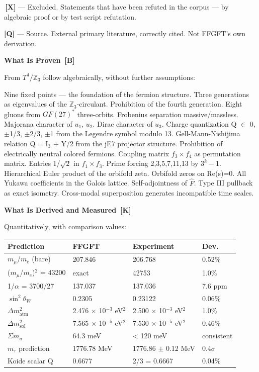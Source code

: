 \documentclass[11pt,oneside]{book}
\newcommand{\status}[1]{\penalty10000\,{\scriptsize\textcolor{gray!60}{[#1]}}}
\begin{document}
\textbf{\status{X}} — Excluded. Statements that have been refuted in the corpus —
by algebraic proof or by test script refutation.

\textbf{[Q]} — Source. External primary literature, correctly cited. Not
FFGFT's own derivation.

\textbf{What Is Proven \status{B}}

From $T^4/\mathbb{Z}_3$ follow algebraically, without further assumptions:

Nine fixed points — the foundation of the fermion structure. Three
generations as eigenvalues of the $\mathbb{Z}_3$-circulant. Prohibition of the
fourth generation. Eight gluons from $GF(27)^*$ three-orbits. Frobenius
separation massive/massless. Majorana character of $
u_1$, $
u_2$. Dirac
character of $
u_3$. Charge quantization Q $\in$ {0, $\pm$1/3, $\pm$2/3, $\pm$1} from the
Legendre symbol modulo 13. Gell-Mann-Nishijima relation Q = I$_3$ + Y/2 from
the jE7 projector structure. Prohibition of electrically neutral colored
fermions. Coupling matrix $f_3\times f_4$ as permutation matrix. Entries
1/$\sqrt{2}$ in $f_1\times f_3$. Prime forcing {2,3,5,7,11,13} by $3^k-$1.
Hierarchical Euler product of the orbifold zeta. Orbifold zeros on
Re(s)=0. All Yukawa coefficients in the Galois lattice. Self-adjointness of
$\hat{F}$. Type III pullback as exact isometry. Cross-modal superposition
generates incompatible time scales.

\textbf{What Is Derived and Measured \status{K}}

Quantitatively, with comparison values:

\begin{center}
\small
\begin{tabular}{p{2.5cm}p{1.8cm}p{2cm}l}
\toprule
Prediction & FFGFT & Experiment & Dev. \\
\midrule
$m_\mu$/$m_e$ (bare) & 207.846 & 206.768 & 0.52\% \\
($m_\mu$/$m_e$)$^2$ = 43200 & exact & 42753 & 1.0\% \\
1/$\alpha$ = 3700/27 & 137.037 & 137.036 & 7.6 ppm \\
$\sin^2\theta_W$ & 0.2305 & 0.23122 & 0.06\% \\
$\Delta m^2_\text{atm}$ & 2.476 $\times$ 10$^{-3}$ eV$^2$ & 2.500 $\times$ 10$^{-3}$ eV$^2$ & 1.0\% \\
$\Delta m^2_\text{sol}$ & 7.565 $\times$ 10$^{-5}$ eV$^2$ & 7.530 $\times$ 10$^{-5}$ eV$^2$ & 0.46\% \\
$\Sigma m_
u$ & 64.3 meV & < 120 meV & consistent \\
$m_\tau$ prediction & 1776.78 MeV & 1776.86 $\pm$ 0.12 MeV & 0.4$\sigma$ \\
Koide scalar Q & 0.6677 & 2/3 = 0.6667 & 0.04\% \\
\bottomrule
\end{tabular}
\end{center}
\end{document}
